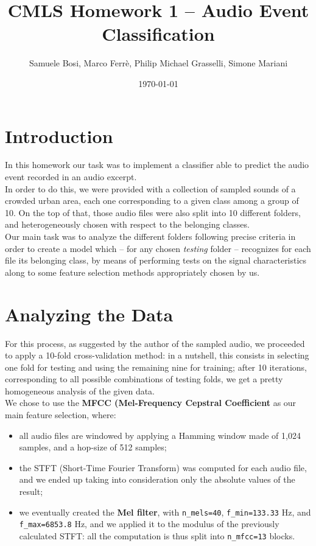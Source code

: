 \documentclass[11pt]{article}
\author{Samuele Bosi, Marco Ferrè, Philip Michael Grasselli, Simone Mariani}
\title{\textbf{CMLS Homework 1 – Audio Event Classification}}
\date{\today}
\begin{document}
\maketitle
\tableofcontents

\section{Introduction}
In this homework our task was to implement a classifier able to predict the audio event recorded in an audio excerpt.\\
In order to do this, we were provided with a collection of sampled sounds of a crowded urban area, each one corresponding to a given class among a group of 10. On the top of that, those audio files were also split into 10 different folders, and heterogeneously chosen with respect to the belonging classes.\\
Our main task was to analyze the different folders following precise criteria in order to create a model which -- for any chosen \textit{testing} folder -- recognizes for each file its belonging class, by means of performing tests on the signal characteristics along to some feature selection methods appropriately chosen by us.

\section{Analyzing the Data}

For this process, as suggested by the author of the sampled audio, we proceeded to apply a 10-fold cross-validation method: in a nutshell, this consists in selecting one fold for testing and using the remaining nine for training; after 10 iterations, corresponding to all possible combinations of testing folds, we get a pretty homogeneous analysis of the given data.\\
We chose to use the \textbf{MFCC (Mel-Frequency Cepstral Coefficient} as our main feature selection, where:
\begin{itemize}
\item all audio files are windowed by applying a Hamming window made of 1,024 samples, and a hop-size of 512 samples;
\item the STFT (Short-Time Fourier Transform) was computed for each audio file, and we ended up taking into consideration only the absolute values of the result;
\item we eventually created the \textbf{Mel filter}, with \texttt{n{\_}mels=40}, \texttt{f{\_}min=133.33} Hz, and \texttt{f{\_}max=6853.8} Hz, and we applied it to the modulus of the previously calculated STFT: all the computation is thus split into \texttt{n{\_}mfcc=13} blocks.
\end{itemize}
\end{document}
